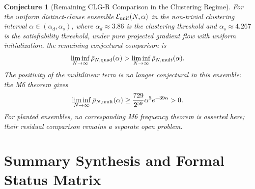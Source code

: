 \documentclass[11pt,a4paper]{article}
\newtheorem{conjecture}[theorem]{Conjecture}
\begin{document}
\begin{conjecture}[Remaining CLG-R Comparison in the Clustering Regime]
\label{conj:clg_separation}
For the uniform distinct-clause ensemble $\mathcal E_{\rm unif}(N,\alpha)$ in the non-trivial clustering interval $\alpha \in (\alpha_d, \alpha_s)$, where $\alpha_d \approx 3.86$ is the clustering threshold \cite{krzakala2007gibbs} and $\alpha_s \approx 4.267$ is the satisfiability threshold, under pure projected gradient flow with uniform initialization, the remaining conjectural comparison is
\begin{equation}
\liminf_{N\to\infty}\bar\rho_{N,\rm quad}(\alpha)
>
\liminf_{N\to\infty}\bar\rho_{N,\rm mult}(\alpha).
\end{equation}
The positivity of the multilinear term is no longer conjectural in this ensemble: the M6 theorem gives
\[
\liminf_{N\to\infty}\bar\rho_{N,\rm mult}(\alpha)
\ge
\frac{729}{2^{59}}\alpha^5e^{-39\alpha}>0.
\]
For planted ensembles, no corresponding M6 frequency theorem is asserted here; their residual comparison remains a separate open problem.
\end{conjecture}

\section{Summary Synthesis and Formal Status Matrix}
\end{document}
